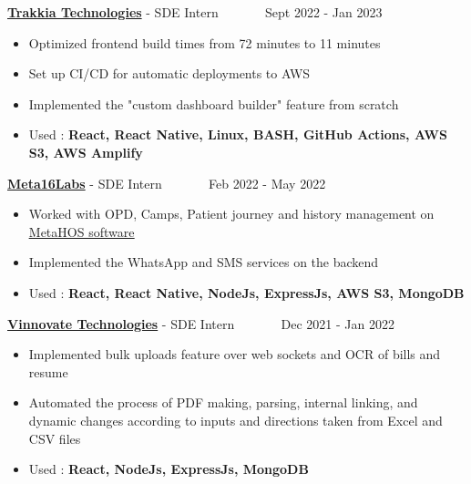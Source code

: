 \documentclass[10pt,a4paper,ragged2e,withhyper]{altacv}
\begin{document}
\begin{paracol}{2}


\large \textcolor{VividPurple}{\href{https://www.trakkia.com}{\textbf{Trakkia Technologies}}} - SDE Intern ~~~~~~ \normalsize \faCalendar Sept 2022 - Jan 2023

\begin{itemize}
  \item Optimized frontend build times from 72 minutes to 11 minutes 
  \item Set up CI/CD for automatic deployments to AWS
  \item Implemented the "custom dashboard builder" feature from scratch
  \item Used : \textcolor{VividPurple}{\textbf{React, React Native, Linux, BASH, GitHub Actions, AWS S3, AWS Amplify}}
\end{itemize}

\divider

\large \textcolor{VividPurple}{\href{https://m16labs.com}{\textbf{Meta16Labs}}} - SDE Intern ~~~~~~ \normalsize \faCalendar Feb 2022 - May 2022

\begin{itemize}
  \item Worked with OPD, Camps, Patient journey and history management on \href{https://metahos.com/}{\underline{MetaHOS software}} 
  \item Implemented the WhatsApp and SMS services on the backend
  \item Used : \textcolor{VividPurple}{\textbf{React, React Native, NodeJs, ExpressJs, AWS S3, MongoDB }}
\end{itemize}

\divider

\large \textcolor{VividPurple}{\href{https://vinnovatetechnologies.com}{\textbf{Vinnovate Technologies}}} - SDE Intern ~~~~~~ \normalsize \faCalendar Dec 2021 - Jan 2022

\begin{itemize}
  \item Implemented bulk uploads feature over web sockets and OCR of bills and resume
  \item Automated the process of PDF making, parsing, internal linking, and dynamic changes according to inputs and directions taken from Excel and CSV files
  \item Used : \textcolor{VividPurple}{\textbf{React, NodeJs, ExpressJs, MongoDB }}
\end{itemize}


\end{paracol}
\end{document}
